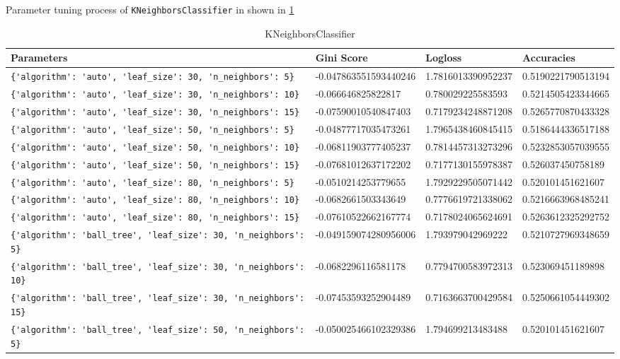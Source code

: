 Parameter tuning process of \verb|KNeighborsClassifier| in shown in \cref{pt:KNeighborsClassifier} 

\begin{table} \centering
\caption{KNeighborsClassifier} 
\label{pt:KNeighborsClassifier} 
\begin{tabular}{llll}\toprule\bfseries Parameters & \bfseries Gini Score & \bfseries Logloss &\bfseries Accuracies \\\midrule 
\verb|{'algorithm': 'auto', 'leaf_size': 30, 'n_neighbors': 5}| & -0.047863551593440246 & 1.7816013390952237 & 0.5190221790513194 \\ 
\verb|{'algorithm': 'auto', 'leaf_size': 30, 'n_neighbors': 10}| & -0.066646825822817 & 0.780029225583593 & 0.5214505423344665 \\ 
\verb|{'algorithm': 'auto', 'leaf_size': 30, 'n_neighbors': 15}| & -0.07590010540847403 & 0.7179234248871208 & 0.5265770870433328 \\ 
\verb|{'algorithm': 'auto', 'leaf_size': 50, 'n_neighbors': 5}| & -0.04877717035473261 & 1.7965438460845415 & 0.5186444336517188 \\ 
\verb|{'algorithm': 'auto', 'leaf_size': 50, 'n_neighbors': 10}| & -0.06811903777405237 & 0.7814457313273296 & 0.5232853057039555 \\ 
\verb|{'algorithm': 'auto', 'leaf_size': 50, 'n_neighbors': 15}| & -0.07681012637172202 & 0.7177130155978387 & 0.526037450758189 \\ 
\verb|{'algorithm': 'auto', 'leaf_size': 80, 'n_neighbors': 5}| & -0.0510214253779655 & 1.7929229505071442 & 0.520101451621607 \\ 
\verb|{'algorithm': 'auto', 'leaf_size': 80, 'n_neighbors': 10}| & -0.0682661503343649 & 0.7776619721338062 & 0.5216663968485241 \\ 
\verb|{'algorithm': 'auto', 'leaf_size': 80, 'n_neighbors': 15}| & -0.07610522662167774 & 0.7178024065624691 & 0.5263612325292752 \\ 
\verb|{'algorithm': 'ball_tree', 'leaf_size': 30, 'n_neighbors': 5}| & -0.049159074280956006 & 1.793979042969222 & 0.5210727969348659 \\ 
\verb|{'algorithm': 'ball_tree', 'leaf_size': 30, 'n_neighbors': 10}| & -0.0682296116581178 & 0.7794700583972313 & 0.523069451189898 \\ 
\verb|{'algorithm': 'ball_tree', 'leaf_size': 30, 'n_neighbors': 15}| & -0.07453593252904489 & 0.7163663700429584 & 0.5250661054449302 \\ 
\verb|{'algorithm': 'ball_tree', 'leaf_size': 50, 'n_neighbors': 5}| & -0.050025466102329386 & 1.794699213483488 & 0.520101451621607 \\ 

\end{tabular}
\end{table}
